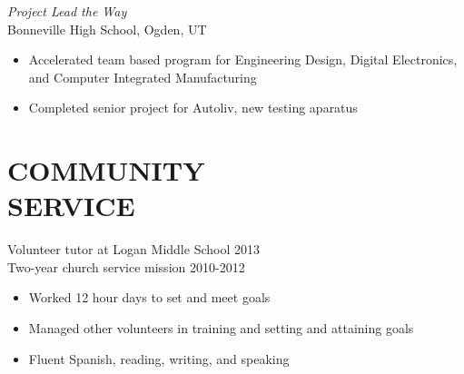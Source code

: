 \documentclass[line,margin]{res}
\begin{document}
\begin{resume}
   {\sl Project Lead the Way}\\
   Bonneville High School, Ogden, UT
   \begin{itemize} \itemsep -2pt
	   \item Accelerated team based program for Engineering Design, Digital Electronics,
			 and Computer Integrated Manufacturing
	   \item Completed senior project for Autoliv, new testing aparatus
   \end{itemize}

	\section{COMMUNITY \\ SERVICE}


	Volunteer tutor at Logan Middle School \hfill 2013
	\\Two-year church service mission \hfill 2010-2012
	\begin{itemize} \itemsep -2pt %
		\item Worked 12 hour days to set and meet goals
		\item Managed other volunteers in training and setting and attaining goals
		\item Fluent Spanish, reading, writing, and speaking
	\end{itemize}





\end{resume}
\end{document}
